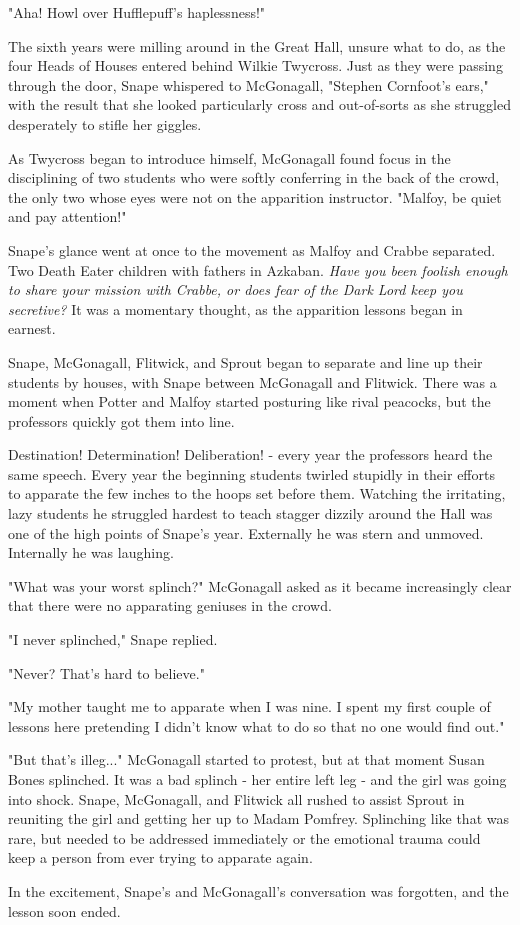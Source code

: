 \documentclass[a4paper,11pt]{article}
\begin{document}
"Aha! Howl over Hufflepuff's haplessness!"

The sixth years were milling around in the Great Hall, unsure what to do, as the four Heads of Houses entered behind Wilkie Twycross. Just as they were passing through the door, Snape whispered to McGonagall, "Stephen Cornfoot's ears," with the result that she looked particularly cross and out-of-sorts as she struggled desperately to stifle her giggles.

As Twycross began to introduce himself, McGonagall found focus in the disciplining of two students who were softly conferring in the back of the crowd, the only two whose eyes were not on the apparition instructor. "Malfoy, be quiet and pay attention!"

Snape's glance went at once to the movement as Malfoy and Crabbe separated. Two Death Eater children with fathers in Azkaban. \emph{Have you been foolish enough to share your mission with Crabbe, or does fear of the Dark Lord keep you secretive?} It was a momentary thought, as the apparition lessons began in earnest.

Snape, McGonagall, Flitwick, and Sprout began to separate and line up their students by houses, with Snape between McGonagall and Flitwick. There was a moment when Potter and Malfoy started posturing like rival peacocks, but the professors quickly got them into line.

Destination! Determination! Deliberation! - every year the professors heard the same speech. Every year the beginning students twirled stupidly in their efforts to apparate the few inches to the hoops set before them. Watching the irritating, lazy students he struggled hardest to teach stagger dizzily around the Hall was one of the high points of Snape's year. Externally he was stern and unmoved. Internally he was laughing.

"What was your worst splinch?" McGonagall asked as it became increasingly clear that there were no apparating geniuses in the crowd.

"I never splinched," Snape replied.

"Never? That's hard to believe."

"My mother taught me to apparate when I was nine. I spent my first couple of lessons here pretending I didn't know what to do so that no one would find out."

"But that's illeg..." McGonagall started to protest, but at that moment Susan Bones splinched. It was a bad splinch - her entire left leg - and the girl was going into shock. Snape, McGonagall, and Flitwick all rushed to assist Sprout in reuniting the girl and getting her up to Madam Pomfrey. Splinching like that was rare, but needed to be addressed immediately or the emotional trauma could keep a person from ever trying to apparate again.

In the excitement, Snape's and McGonagall's conversation was forgotten, and the lesson soon ended.
\end{document}
